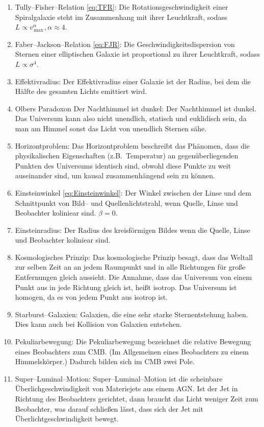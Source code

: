 \documentclass[a4paper,12pt]{article}
\numberwithin{equation}{section}
\begin{document}
\begin{enumerate}[label=$\circ$]
\begin{enumerate}[label=]
                \end{enumerate}
        \item Tully--Fisher--Relation \eqref{eq:TFR}: Die Rotationsgeschwindigkeit einer Spiralgalaxie steht im Zusammenhang mit ihrer Leuchtkraft, sodass $L\propto v_{\,\text{max}\,}^\alpha ,\alpha \approx 4$.
        \item Faber--Jackson--Relation \eqref{eq:FJR}: Die Geschwindigkeitsdispersion von Sternen einer elliptischen Galaxie ist proportional zu ihrer Leuchtkraft, sodass $L\propto \sigma ^4$.
        \item Effektivradius: Der Effektivradius einer Galaxie ist der Radius, bei dem die Hälfte des gesamten Lichts emittiert wird.
        \item Olbers Paradoxon \glqq Der Nachthimmel ist dunkel\grqq{}: Der Nachthimmel ist dunkel. Das Universum kann also nicht unendlich, statisch und euklidisch sein, da man am Himmel sonst das Licht von unendlich Sternen sähe.
        \item Horizontproblem: Das Horizontproblem beschreibt das Phänomen, dass die physikalischen Eigenschaften (z.B.\ Temperatur) an gegenüberliegenden Punkten des Universums identisch sind, obwohl diese Punkte zu weit auseinander sind, um kausal zusammenhängend sein zu können.
        \item Einsteinwinkel \eqref{eq:Einsteinwinkel}: Der Winkel zwischen der Linse und dem Schnittpunkt von Bild-- und Quellenlichtstrahl, wenn Quelle, Linse und Beobachter koliniear sind. $\beta =0$.
        \item Einsteinradius: Der Radius des kreisförmigen Bildes wenn die Quelle, Linse und Beobachter koliniear sind.
        \item Kosmologisches Prinzip: Das kosmologische Prinzip besagt, dass das Weltall zur selben Zeit an an jedem Raumpunkt und in alle Richtungen für große Entfernungen gleich aussieht. Die Annahme, dass das Universum von einem Punkt aus in jede Richtung gleich ist, heißt isotrop. Das Universum ist homogen, da es von jedem Punkt aus isotrop ist.
        \item Starburst--Galaxien: Galaxien, die eine sehr starke Sternentstehung haben. Dies kann auch bei Kollision von Galaxien entstehen.
        \item Pekuliarbewegung: Die Pekuliarbewegung bezeichnet die relative Bewegung eines Beobachters zum CMB. (Im Allgemeinen eines Beobachters zu einem Himmelskörper.) Dadurch bilden sich im CMB zwei Pole.
        \item Super--Luminal--Motion: Super--Luminal--Motion ist die scheinbare Überlichgeschwindigkeit von Materiejets aus einem AGN. Ist der Jet in Richtung des Beobachters gerichtet, dann braucht das Licht weniger Zeit zum Beobachter, was darauf schließen lässt, dass sich der Jet mit Überlichtgeschwindigkeit bewegt.

\end{enumerate}
\end{document}
